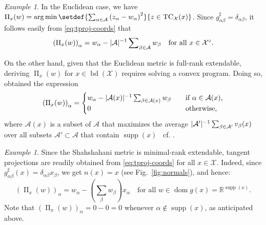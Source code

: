 \documentclass[reqno]{amsart}
\DeclarePairedDelimiter{\abs}{\lvert}{\rvert}
\theoremstyle{plain}
\theoremstyle{definition}
\theoremstyle{remark}
\newtheorem{example}[theorem]{Example}
\numberwithin{equation}{section}
\numberwithin{theorem}{section}
\begin{document}
\medskip

\begin{example}
\label{ex:EuclideanAgain}
In the Euclidean case, we have $\operatorname{\Pi}_{x}(w) = \operatorname*{arg\,min} \setdef{\sum_{\alpha\in{\mathcal{A}}} \left(z_{\alpha} - w_{\alpha}\right)^{2}}{z \in\operatorname{TC}_{\mathcal{X}}(x) }$.
Since $g^\sharp_{\alpha\beta} = \delta_{\alpha\beta}$, it follows easily from \eqref{eq:tproj-coords} that  
\begin{equation}
\label{eq:tproj-Eucl-int}
\left(\operatorname{\Pi}_{x}(w)\right)_{\alpha}
	= w_{\alpha} - \abs{\mathcal{A}}^{-1} \sum\nolimits_{\beta\in{\mathcal{A}}} w_{\beta}
	\quad
	\text{for all $x\in{{\mathcal{X}}^{\circ}}$}.
\end{equation}

On the other hand, given that the Euclidean metric is full-rank extendable, deriving $\operatorname{\Pi}_{x}(w)$ for $x\in\operatorname{bd}({\mathcal{X}})$ requires solving a convex program.
Doing so, \cite{LS08} obtained the expression
\begin{equation}
\label{eq:tproj-Eucl}
\left( \operatorname{\Pi}_{x}(w)\right )_{\alpha}
	= \begin{cases}
	w_{\alpha} - \abs{{\mathcal{A}}(x)}^{-1} \sum_{\beta\in{\mathcal{A}}(x)} w_{\beta}
		&\quad
		\text{if $\alpha\in{\mathcal{A}}(x)$,}
		\\
	0
		&\quad
		\text{otherwise,}
	\end{cases}
\end{equation}
where ${\mathcal{A}}(x)$ is a subset of ${\mathcal{A}}$ that maximizes the average $\abs{{\mathcal{A}}'}^{-1} \sum_{\beta\in{\mathcal{A}}'} {v}_{\beta}(x)$ over all subsets ${\mathcal{A}}'\subset{\mathcal{A}}$ that contain $\operatorname{supp}(x)$ \textendash\ cf. \cite{LS08}.\end{example}

\begin{example}
Since the Shahshahani metric is minimal-rank extendable, tangent projections are readily obtained from \eqref{eq:tproj-coords} for all $x\in{\mathcal{X}}$.
Indeed, since $g_{\alpha\beta}^{\sharp}(x) = \delta_{\alpha\beta} x_{\beta}$, we get ${n}(x) = x$ (see Fig.~\ref{fig:normals}), and hence:
\begin{equation}
\label{eq:tproj-Shah}
\left( \operatorname{\Pi}_{x}(w) \right)_{\alpha}
	= w_{\alpha} -\left({\sum\nolimits}_{\beta} w_{\beta}\right) x_{\alpha}
	\quad
	\text{for all $w \in {\operatorname{dom} g}(x) = {\mathbb{R}}^{\operatorname{supp}(x)}$.}
\end{equation}
Note that $\left( \operatorname{\Pi}_{x}(w) \right)_{\alpha} = 0-0=0$ whenever $\alpha \notin \operatorname{supp}(x)$, as anticipated above.
\end{example}
\end{document}
